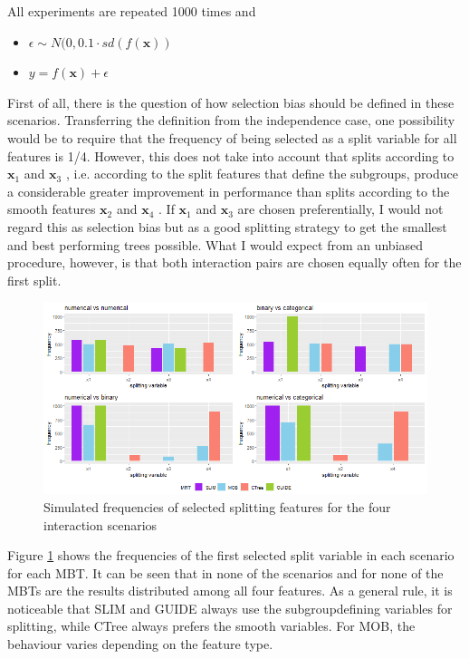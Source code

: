 All experiments are repeated 1000 times and 
\begin{itemize}
     \item $\epsilon \sim N(0, 0.1 \cdot sd(f(\textbf{x}))$
    \item $y = f(\textbf{x}) + \epsilon$   
\end{itemize}


First of all, there is the question of how selection bias should be defined in these scenarios. Transferring the definition from the independence case, one possibility would be to require that the frequency of being selected as a split variable for all features is 1/4.  However, this does not take into account that splits according to $\textbf{x}_1$  and $\textbf{x}_3$ , i.e. according to the split features that define the subgroups, produce a considerable greater improvement in performance than splits according to the smooth features $\textbf{x}_2$  and $\textbf{x}_4$ . If $\textbf{x}_1$  and $\textbf{x}_3$  are chosen preferentially, I would not regard this as selection bias but as a good splitting strategy to get the smallest and best performing trees possible. What I would expect from an unbiased procedure, however, is that both interaction pairs are chosen equally often for the first split.



\begin{figure}[!htb]
    \centering   
    \includegraphics[width = 16cm]{Figures/simulations/batchtools/selection_bias_general/interactions.png}
    \caption{Simulated frequencies of selected splitting features for the four interaction scenarios}
    \label{fig:selection_bias_interactions}
\end{figure}

Figure \ref{fig:selection_bias_interactions} shows the frequencies of the first selected split variable in each scenario for each MBT. It can be seen that in none of the scenarios and for none of the MBTs are the results distributed among all four features. 
As a general rule, it is noticeable that SLIM and GUIDE always use the subgroupdefining variables for splitting, while CTree always prefers the smooth variables. For MOB, the behaviour varies depending on the feature type.

